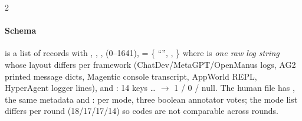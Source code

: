 \begin{multicols}{2}
\paragraph{Schema}  is a list of records with , , ,  (0--1641),  = \{ ``'', , \} where  is \emph{one raw log string} whose layout differs per framework (ChatDev/MetaGPT/OpenManus logs, AG2 printed message dicts, Magentic console transcript, AppWorld REPL, HyperAgent logger lines), and : 14 keys \ldots{} $\to$ 1 / 0 / null. The human file has , the same metadata and : per mode, three boolean annotator votes; the mode list differs per round (18/17/17/14) so codes are not comparable across rounds.
\end{multicols}

